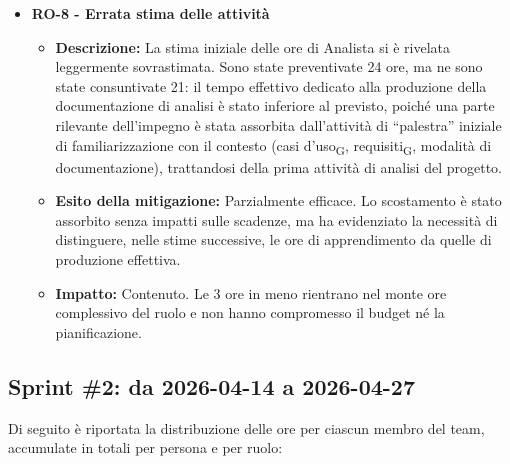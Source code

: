 ﻿\documentclass[a4paper, 10pt, colorlinks=true, linkcolor=black, urlcolor=blue, citecolor=blue, hidelinks]{article}
\begin{document}
\begin{itemize}
\begin{itemize}
\begin{itemize}
            \item \textbf{Impatto:} Inefficienze organizzative che non hanno compromesso le scadenze dello sprint\textsubscript{G}. In particolare, è stato necessario dedicare tempo alla comprensione degli strumenti e al loro utilizzo corretto, riducendo parzialmente le ore di produzione effettiva.
        \end{itemize}
        \item \textbf{RO-8 - Errata stima delle attività}
        \begin{itemize}
            \item \textbf{Descrizione:} La stima iniziale delle ore di Analista si è
            rivelata leggermente sovrastimata. Sono state preventivate 24 ore, ma ne
            sono state consuntivate 21: il tempo effettivo dedicato alla produzione
            della documentazione di analisi è stato inferiore al previsto, poiché una
            parte rilevante dell'impegno è stata assorbita dall'attività di ``palestra''
            iniziale di familiarizzazione con il contesto (casi d'uso\textsubscript{G},
            requisiti\textsubscript{G}, modalità di documentazione), trattandosi della
            prima attività di analisi del progetto.
            \item \textbf{Esito della mitigazione:} Parzialmente efficace. Lo
            scostamento è stato assorbito senza impatti sulle scadenze, ma ha
            evidenziato la necessità di distinguere, nelle stime successive, le ore di
            apprendimento da quelle di produzione effettiva.
            \item \textbf{Impatto:} Contenuto. Le 3 ore in meno rientrano nel
            monte ore complessivo del ruolo e non hanno compromesso il budget né la
            pianificazione.
        \end{itemize}
    \end{itemize}
\end{itemize}

\subsection{Sprint \#2: da 2026-04-14 a 2026-04-27}
Di seguito è riportata la distribuzione delle ore per ciascun membro del team, accumulate in totali per persona e per ruolo:
\end{document}
